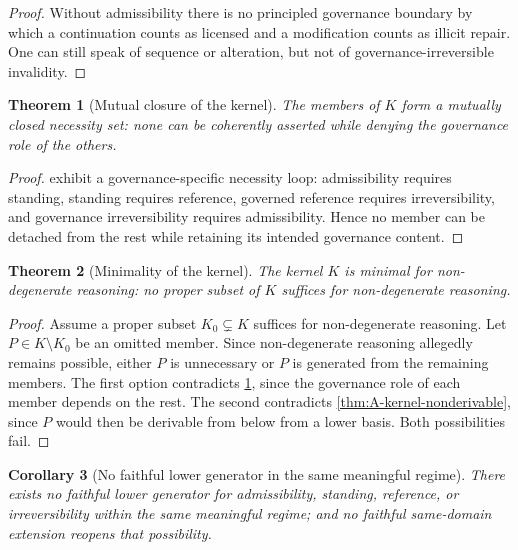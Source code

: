 \documentclass[11pt]{article}
\theoremstyle{plain}
\newtheorem{theorem}{Theorem}[section]
\newtheorem{corollary}[theorem]{Corollary}
\theoremstyle{definition}
\begin{document}
\begin{proof}
Without admissibility there is no principled governance boundary by which a continuation counts as licensed and a modification counts as illicit repair. One can still speak of sequence or alteration, but not of governance-irreversible invalidity.
\end{proof}

\begin{theorem}[Mutual closure of the kernel]
\label{thm:A-mutual-closure}
The members of $K$ form a mutually closed necessity set: none can be coherently asserted while denying the governance role of the others.
\end{theorem}

\begin{proof}
 exhibit a governance-specific necessity loop: admissibility requires standing, standing requires reference, governed reference requires irreversibility, and governance irreversibility requires admissibility. Hence no member can be detached from the rest while retaining its intended governance content.
\end{proof}

\begin{theorem}[Minimality of the kernel]
\label{thm:A-minimality}
The kernel $K$ is minimal for non-degenerate reasoning: no proper subset of $K$ suffices for non-degenerate reasoning.
\end{theorem}

\begin{proof}
Assume a proper subset $K_0\subsetneq K$ suffices for non-degenerate reasoning. Let $P\in K\setminus K_0$ be an omitted member. Since non-degenerate reasoning allegedly remains possible, either $P$ is unnecessary or $P$ is generated from the remaining members. The first option contradicts \cref{thm:A-mutual-closure}, since the governance role of each member depends on the rest. The second contradicts \cref{thm:A-kernel-nonderivable}, since $P$ would then be derivable from below from a lower basis. Both possibilities fail.
\end{proof}

\begin{corollary}[No faithful lower generator in the same meaningful regime]
\label{cor:A-no-lower-generator}
There exists no faithful lower generator for admissibility, standing, reference, or irreversibility within the same meaningful regime; and no faithful same-domain extension reopens that possibility.
\end{corollary}
\end{document}
